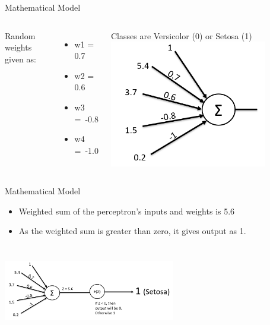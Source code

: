 \documentclass[aspectratio=169,14pt,usenames,dvipsnames]{beamer}
\begin{document}
\begin{frame}{Mathematical Model}
\begin{columns}
\item Random weights given as:
	\begin{itemize}
	  \item w1 = 0.7\\
	  \item w2 = 0.6\\
	  \item w3 = -0.8\\
	  \item w4 = -1.0  
\end{itemize}
\item Classes are Versicolor (0) or Setosa (1)
\includegraphics[width=0.8\textwidth, height=0.6\textheight]{Images/AIML_Percep_IMG7.png}
\end{columns}
\end{frame}

\begin{frame}{Mathematical Model}
\begin{itemize}
\item Weighted sum of the perceptron’s inputs and weights is 5.6
\item As the weighted sum is greater than zero, it gives output as 1. 
\end{itemize}
\centering
\includegraphics[width=7.5cm , height=4.0cm]{Images/AIML_Percep_IMG8.png}
\end{frame}
\end{document}
